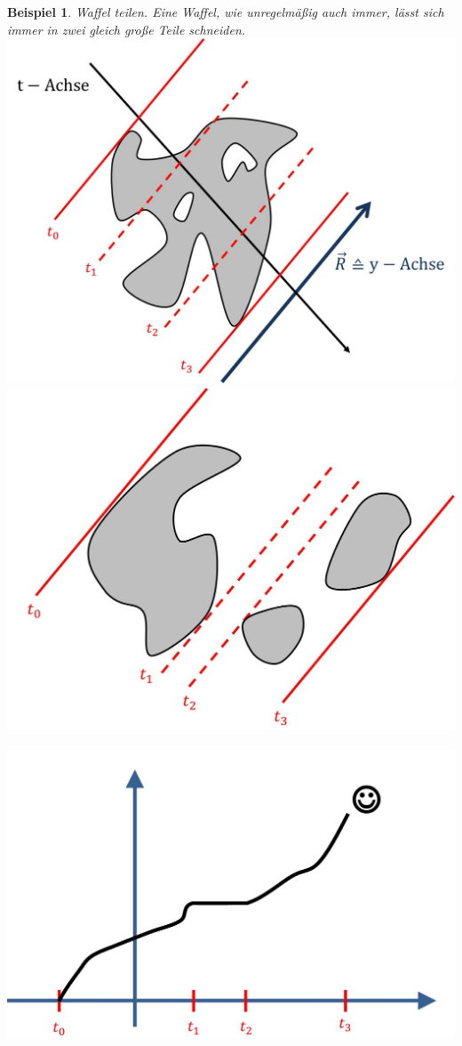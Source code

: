\documentclass[a4paper,11pt,notitlepage]{report}
\newtheorem{example}{Beispiel}[chapter]
\begin{document}
\begin{example}{Waffel teilen.}
	Eine Waffel, wie unregelmäßig auch immer, lässt sich immer in zwei gleich große Teile schneiden.
	\newline
\includegraphics[scale=0.4]{images/Waffel_zshgd.jpg}
\newline
\includegraphics[scale=0.3]{images/Waffel_unzshgd.jpg} $\qquad$
\includegraphics[scale=0.3]{images/Waffel_unzshgd_Fkt.jpg}

\end{example}
\end{document}
